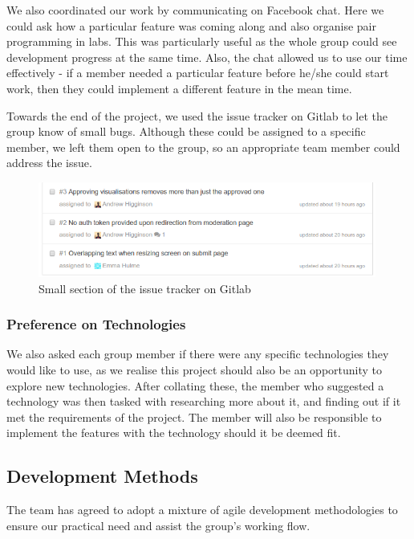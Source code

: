 \documentclass[a4paper, titlepage]{article}
\begin{document}
We also coordinated our work by communicating on Facebook chat. Here we could ask how a particular 
feature was coming along and also organise pair programming in labs. This was particularly useful as 
the whole group could see development progress at the same time. Also, the chat allowed us to use our 
time effectively - if a member needed a particular feature before he/she could start work, then they
could implement a different feature in the mean time. 

Towards the end of the project, we used the issue tracker on Gitlab to let the group know of small bugs.
Although these could be assigned to a specific member, we left them open to the group, so an
appropriate team member could address the issue. 

\begin{figure}[h]
  \centering
    \includegraphics[width = 0.99\textwidth]{./projman/issue_page.png}
  \caption{Small section of the issue tracker on Gitlab}
  \label{fig:projman_issues}
\end{figure}




\subsubsection{Preference on Technologies}
We also asked each group member if there were any specific technologies they 
would like to use, as we realise this project should also be an opportunity to explore new
technologies. After collating these, the member who suggested a technology was then 
tasked with researching more about it, and finding out if it met the requirements of the project.
The member will also be responsible to implement the features with the technology should it be
deemed fit.



\subsection{Development Methods} \label{sec:projman_devprocess}
The team has agreed to adopt a mixture of agile development methodologies to
ensure our practical need and assist the group's working flow.
\end{document}
